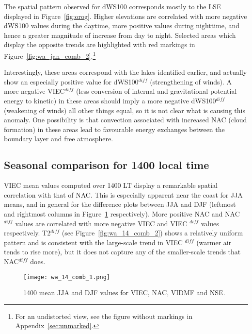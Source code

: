 The spatial pattern observed for \acs{dWS100} corresponds mostly to the \ac{LSE} displayed in Figure~\ref{fig:orog}. Higher elevations are correlated with more negative d\ac{WS100} values during the daytime, more positive values during nighttime, and hence a greater magnitude of increase from day to night. Selected areas which display the opposite trends are highlighted with red markings in Figure~\ref{fig:wa_jan_comb_2}.\footnote{For an undistorted view, see the figure without markings in Appendix~\ref{sec:unmarked}.}

Interestingly, these areas correspond with the lakes identified earlier, and actually show an especially positive value for \acs{dWS100}$^{diff}$ (strengthening of winds). A more negative \ac{VIEC}$^{diff}$ (less conversion of internal and gravitational potential energy to kinetic) in these areas should imply a more negative \acs{dWS100}$^{diff}$ (weakening of winds) all other things equal, so it is not clear what is causing this anomaly. One possibility is that convection associated with increased \ac{NAC} (cloud formation) in these areas lead to favourable energy exchanges between the boundary layer and free atmosphere.

\subsection{Seasonal comparison for 1400 local time}

\ac{VIEC} mean values computed over 1400 \ac{LT} display a remarkable spatial correlation with that of \ac{NAC}. This is especially apparent near the coast for \ac{JJA} means, and in general for the difference plots between \ac{JJA} and \ac{DJF} (leftmost and rightmost columns in Figure~\ref{fig:wa_14_comb_1} respectively). More positive \ac{NAC} and \ac{NAC}$^{diff}$ values are correlated with more negative \ac{VIEC} and \ac{VIEC} $^{diff}$ values respectively. \ac{T2}$^{diff}$ (see Figure~\ref{fig:wa_14_comb_2}) shows a relatively uniform pattern and is consistent with the large-scale trend in \ac{VIEC} $^{diff}$ (warmer air tends to rise more), but it does not capture any of the smaller-scale trends that \ac{NAC}$^{diff}$ does.

\begin{figure}[!ht]
	\centering
	\texttt{[image: wa\_14\_comb\_1.png]}
	\caption[WA 1400 means for selected variables 1]{1400 mean \acs{JJA} and \acs{DJF} values for \acs{VIEC}, \acs{NAC}, \acs{VIDMF} and \acs{NSE}.}
	\label{fig:wa_14_comb_1}
\end{figure}

